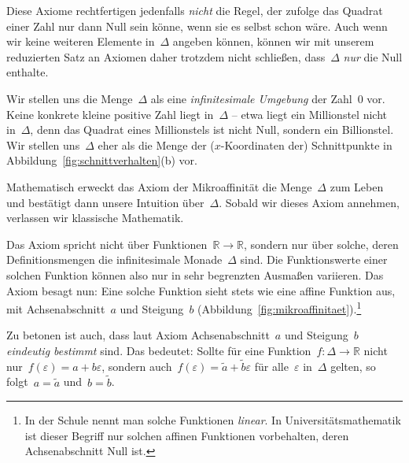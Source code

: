 \documentclass[twoside]{../zirkelblatt}
\newcommand{\RR}{\mathbb{R}}
\theoremstyle{definition}
\theoremstyle{plain}
\theoremstyle{remark}
\begin{document}
Diese Axiome rechtfertigen jedenfalls \emph{nicht} die Regel, der zufolge das
Quadrat einer Zahl nur dann Null sein könne, wenn sie es selbst schon wäre.
Auch wenn wir keine weiteren Elemente in~$\Delta$ angeben können, können wir
mit unserem reduzierten Satz an Axiomen daher trotzdem nicht schließen,
dass~$\Delta$ \emph{nur} die Null enthalte.

Wir stellen uns die Menge~$\Delta$ als eine \emph{infinitesimale Umgebung} der
Zahl~$0$ vor. Keine konkrete kleine positive Zahl liegt in~$\Delta$ -- etwa
liegt ein Millionstel nicht in~$\Delta$, denn das Quadrat eines Millionstels
ist nicht Null, sondern ein Billionstel. Wir stellen uns~$\Delta$ eher als die
Menge der ($x$-Koordinaten der) Schnittpunkte in Abbildung~\ref{fig:schnittverhalten}(b) vor.

Mathematisch erweckt das Axiom der Mikroaffinität die Menge~$\Delta$ zum Leben
und bestätigt dann unsere Intuition über~$\Delta$. Sobald wir dieses Axiom
annehmen, verlassen wir klassische Mathematik.

\textcolor{darkred}{\hspace{-5cm}}

\axiommikro

Das Axiom spricht nicht über Funktionen~$\RR \to \RR$, sondern nur
über solche, deren Definitionsmengen die infinitesimale Monade~$\Delta$ sind.
Die Funktionswerte einer solchen Funktion können also nur in sehr begrenzten
Ausmaßen variieren. Das Axiom besagt nun: Eine solche Funktion sieht stets wie
eine affine Funktion aus, mit Achsenabschnitt~$a$ und Steigung~$b$
(Abbildung~\ref{fig:mikroaffinitaet}).\footnote{In der Schule nennt man solche
Funktionen \emph{linear}. In Universitätsmathematik ist dieser Begriff nur
solchen affinen Funktionen vorbehalten, deren Achsenabschnitt Null ist.}

Zu betonen ist auch, dass laut Axiom Achsenabschnitt~$a$ und Steigung~$b$ \emph{eindeutig
bestimmt} sind. Das bedeutet: Sollte für eine Funktion~$f : \Delta \to \RR$
nicht nur~$f(\varepsilon) = a + b\varepsilon$, sondern auch~$f(\varepsilon) =
\tilde a + \tilde b \varepsilon$ für alle~$\varepsilon$ in~$\Delta$ gelten, so
folgt~$a = \tilde a$ und~$b = \tilde b$.
\end{document}
